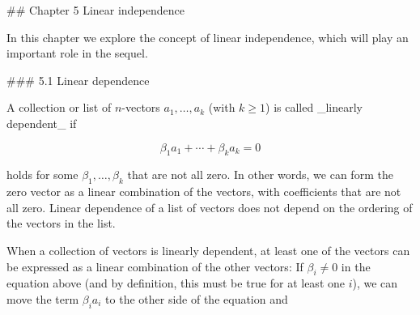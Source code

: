 

## Chapter 5 Linear independence

In this chapter we explore the concept of linear independence, which will play an important role in the sequel.

### 5.1 Linear dependence

A collection or list of \(n\)-vectors \(a_{1},\ldots,a_{k}\) (with \(k\geq 1\)) is called _linearly dependent_ if

\[\beta_{1}a_{1}+\cdots+\beta_{k}a_{k}=0\]

holds for some \(\beta_{1},\ldots,\beta_{k}\) that are not all zero. In other words, we can form the zero vector as a linear combination of the vectors, with coefficients that are not all zero. Linear dependence of a list of vectors does not depend on the ordering of the vectors in the list.

When a collection of vectors is linearly dependent, at least one of the vectors can be expressed as a linear combination of the other vectors: If \(\beta_{i}\neq 0\) in the equation above (and by definition, this must be true for at least one \(i\)), we can move the term \(\beta_{i}a_{i}\) to the other side of the equation and